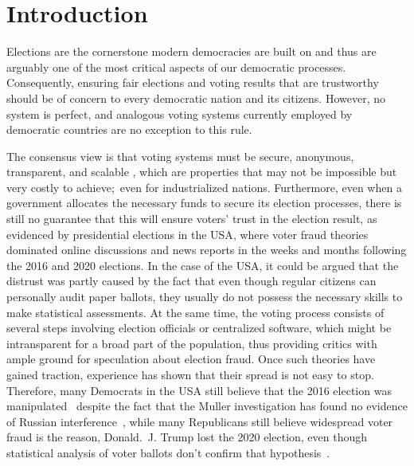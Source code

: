 \chapter{Introduction}\label{ch:intro}

Elections are the cornerstone modern democracies are built on and thus are arguably one of the most critical aspects of our democratic processes.
Consequently, ensuring fair elections and voting results that are trustworthy should be of concern to every democratic nation and its citizens.
However, no system is perfect, and analogous voting systems currently employed by democratic countries are no exception to this rule.

The consensus view is that voting systems must be secure, anonymous, transparent, and scalable
\autocites{lowry_desirable_2009}[5]{agora_agora_nodate}[9-11]{jafar_blockchain_2021},
which are properties that may not be impossible but very costly to achieve;\ even for industrialized nations.
Furthermore, even when a government allocates the necessary funds to secure its election processes, there is still no
guarantee that this will ensure voters' trust in the election result, as evidenced by presidential elections in the \Gls{USA}, where voter fraud theories dominated online discussions and news reports in the weeks and months following the 2016 and 2020 elections.
In the case of the \Gls{USA}, it could be argued that the distrust was partly caused by the fact that even though regular citizens can personally audit paper ballots, they usually do not possess the necessary skills to make statistical assessments.
At the same time, the voting process consists of several steps involving election officials or centralized software, which might be intransparent for a broad part of the population, thus providing critics with ample ground for speculation about election fraud.
Once such theories have gained traction, experience has shown that their spread is not easy to stop.
Therefore, many Democrats in the \Gls{USA} still believe that the 2016 election was manipulated~\autocite{sinclair_its_2018}
despite the fact that the Muller investigation has found no evidence of Russian interference~\autocite{muller_report_2019}, while many Republicans still believe widespread voter fraud is the reason,
Donald.\ J. Trump lost the 2020 election, even though statistical analysis of voter ballots don't confirm that hypothesis~\autocite{eggers_no_2021}.

